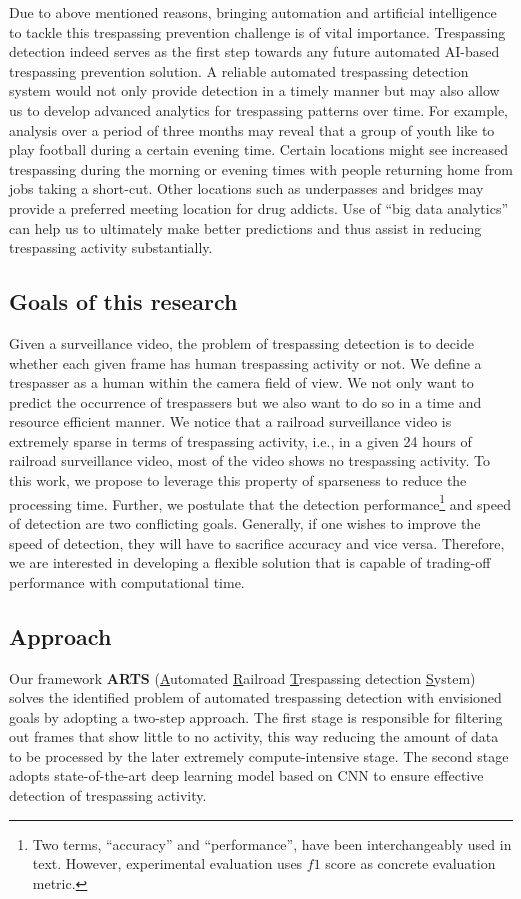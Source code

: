 Due to above mentioned reasons, bringing automation and artificial intelligence to tackle this trespassing prevention challenge is of vital importance. Trespassing detection indeed serves as the first step towards any future automated AI-based trespassing prevention solution. A reliable automated trespassing detection system would not only provide detection in a timely manner but may also allow us to develop advanced analytics for trespassing patterns over time. For example, analysis over a period of three months may reveal that a group of youth like to play football during a certain evening time. Certain locations might see increased trespassing during the morning or evening times with people returning home from jobs taking a short-cut. Other locations such as underpasses and bridges may provide a preferred meeting location for drug addicts. Use of ``big data analytics'' can help us to ultimately make better predictions and thus assist in reducing trespassing activity substantially.
\subsection{Goals of this research}
\label{sec:goal}
Given a surveillance video, the problem of trespassing detection is to decide whether each given frame has human trespassing activity or not. We define a trespasser as a human within the camera field of view. We not only want to predict the occurrence of trespassers but we also want to do so in a time and resource efficient manner. We notice that a railroad surveillance video is extremely sparse in terms of trespassing activity, i.e., in a given 24 hours of railroad surveillance video, most of the video shows no trespassing activity. To this work, we propose to leverage this property of sparseness to reduce the processing time. 
Further, we postulate that the detection performance\footnote{Two terms, ``accuracy'' and ``performance'', have been interchangeably used in text. However, experimental evaluation uses $f1$ score as concrete evaluation metric.} and speed of detection are two conflicting goals. Generally, if one wishes to improve the speed of detection, they will have to sacrifice accuracy and vice versa. Therefore, we are interested in developing a  flexible solution that is capable of trading-off performance with computational time.
\subsection{Approach}
Our framework \textbf{ARTS} (\underline{A}utomated \underline{R}ailroad \underline{T}respassing detection \underline{S}ystem) solves the identified problem of automated trespassing detection with envisioned goals by adopting a two-step approach. The first stage is responsible for filtering out frames that show little to no activity, this way reducing the amount of data to be processed by the later extremely compute-intensive stage. The second stage adopts state-of-the-art deep learning model based on CNN to ensure effective detection of trespassing activity.
